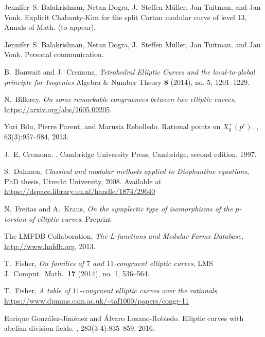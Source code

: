 \documentclass[12pt]{amsart}
\numberwithin{equation}{section}
\theoremstyle{definition}
\theoremstyle{remark}
\begin{document}
 
\begin{thebibliography}{999}

Jennifer~S. Balakrishnan, Netan Dogra, J.~Steffen M\"uller, Jan Tuitman, and
  Jan Vonk.
\newblock Explicit {C}habauty-{K}im for the split Cartan modular curve of level 13, Annals of Math. (to appear).

Jennifer~S. Balakrishnan, Netan Dogra, J.~Steffen M\"uller, Jan Tuitman, and
  Jan Vonk.
\newblock Personal communication.

 B.\ Banwait and J.\ Cremona, 
{\em Tetrahedral Elliptic Curves and the local-to-global principle for Isogenies}
Algebra \& Number Theory {\bf 8} (2014), no. 5, 1201--1229.

 N.~Billerey,
  {\em On some remarkable congruences between two elliptic curves},
  \url{https://arxiv.org/abs/1605.09205}.
  
Yuri Bilu, Pierre Parent, and Marusia Rebolledo.
\newblock Rational points on {$X^+_0(p^r)$}.
, 63(3):957--984, 2013.

J.~E. Cremona.
.
\newblock Cambridge University Press, Cambridge, second edition, 1997.

 S.\ Dahmen,
 {\em Classical and modular methods applied to Diophantine equations}, 
 PhD thesis, Utrecht University, 2008. Available at \\
 \url{https://dspace.library.uu.nl/handle/1874/29640}


 N.\ Freitas and A.\ Kraus,
{\em On the symplectic type of isomorphisms of the $p$-torsion of elliptic curves}, Preprint

 The {LMFDB Collaboration},
{\em The L-functions and Modular Forms Database}, \\
\url{http://www.lmfdb.org}, 2013.

 T.\ Fisher,
{\em On families of $7$ and $11$-congruent elliptic curves}, 
LMS J.\ Comput.\ Math.\ {\bf 17} (2014), no. 1, 536--564.

 T.\ Fisher,
{\em A table of $11$-congruent elliptic curves over the rationals}, \\
\url{https://www.dpmms.cam.ac.uk/~taf1000/papers/congr-11}

Enrique Gonz\'{a}lez-Jim\'{e}nez and \'{A}lvaro Lozano-Robledo.
\newblock Elliptic curves with abelian division fields.
, 283(3-4):835--859, 2016.


\end{thebibliography}
\end{document}
